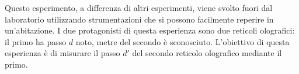 Questo esperimento, a differenza di altri esperimenti, viene svolto fuori dal laboratorio utilizzando strumentazioni che si possono facilmente reperire in un'abitazione. I due protagonisti di questa esperienza sono due reticoli olografici: il primo ha passo $d$ noto, metre del secondo è sconosciuto. L'obiettivo di questa esperienza è di misurare il passo $d'$ del secondo reticolo olografico mediante il primo.